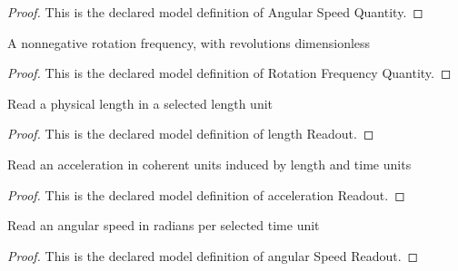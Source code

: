\begin{proof}
  This is the declared model definition of Angular Speed Quantity.
\end{proof}
\begin{definition}
  \label{def:physics:phyx-mini-0687:phyxminiproblems-problemphyxmini0687-rotationfrequencyquantity}
  A nonnegative rotation frequency, with revolutions dimensionless
\end{definition}
\begin{proof}
  This is the declared model definition of Rotation Frequency Quantity.
\end{proof}
\begin{definition}
  \label{def:physics:phyx-mini-0687:phyxminiproblems-problemphyxmini0687-lengthreadout}
  Read a physical length in a selected length unit
\end{definition}
\begin{proof}
  This is the declared model definition of length Readout.
\end{proof}
\begin{definition}
  \label{def:physics:phyx-mini-0687:phyxminiproblems-problemphyxmini0687-accelerationreadout}
  Read an acceleration in coherent units induced by length and time units
\end{definition}
\begin{proof}
  This is the declared model definition of acceleration Readout.
\end{proof}
\begin{definition}
  \label{def:physics:phyx-mini-0687:phyxminiproblems-problemphyxmini0687-angularspeedreadout}
  Read an angular speed in radians per selected time unit
\end{definition}
\begin{proof}
  This is the declared model definition of angular Speed Readout.
\end{proof}
